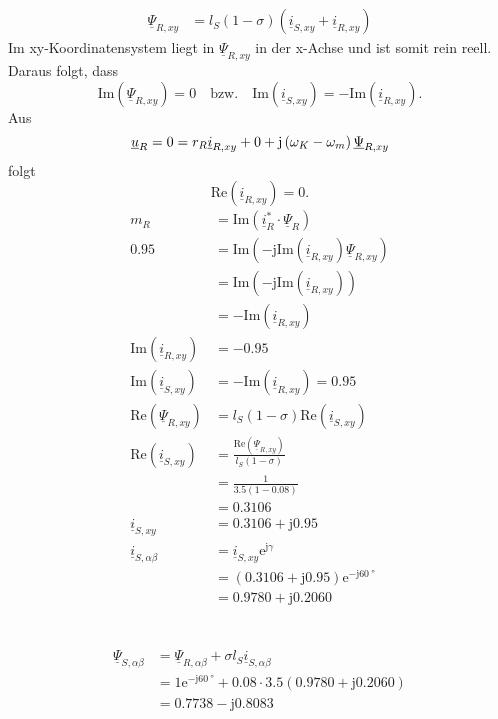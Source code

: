 \documentclass[11pt,a4paper]{scrartcl}
\newcommand{\mybr}[1]{\left(#1\right)}
\renewcommand{\j}{\mathrm{j}}
\renewcommand{\u}{\underline{u}}
\renewcommand{\i}{\underline{i}}
\newcommand{\PPsi}{\underline{\Psi}}
\newcommand{\0}{_{\mybr{0}}}
\newcommand{\1}{_{\mybr{1}}}
\newcommand{\2}{_{\mybr{2}}}
\renewcommand{\e}{\mathrm{e}}
\renewcommand{\Re}{\mathrm{Re}}
\renewcommand{\Im}{\mathrm{Im}}
\begin{document}
\section{}
\begin{align}
	\PPsi_{R,xy}&=l_S\mybr{1-\sigma}\mybr{\i_{S,xy}+\i_{R,xy}}
\end{align}
Im xy-Koordinatensystem liegt in $\PPsi_{R,xy}$ in der x-Achse und ist somit rein reell. Daraus folgt, dass 
\begin{equation}
	\Im\mybr{\PPsi_{R,xy}}=0\quad \text{bzw.}\quad \Im\mybr{\i_{S,xy}}=-\Im\mybr{\i_{R,xy}}.
\end{equation}
Aus
\begin{equation}
	\u_R=0=r_R\i_{R,xy}+0+\j\mybr{\omega_K-\omega_m}\PPsi_{R,xy}\\
\end{equation}
folgt
\begin{equation}
	\Re\mybr{\i_{R,xy}}=0.
\end{equation}
\begin{align}
	m_R&=\Im\mybr{\i_R^*\cdot\PPsi_R}\\
	\num{0.95}&=\Im\mybr{-\j\Im\mybr{\i_{R,xy}}\PPsi_{R,xy}}\\
	&=\Im\mybr{-\j\Im\mybr{\i_{R,xy}}}\\
	&=-\Im\mybr{\i_{R,xy}}\\
	\Im\mybr{\i_{R,xy}}&=\num{-0.95}\\
	\Im\mybr{\i_{S,xy}}&=-\Im\mybr{\i_{R,xy}}=\num{0.95}\\
	\Re\mybr{\PPsi_{R,xy}}&=l_S\mybr{1-\sigma}\Re\mybr{\i_{S,xy}}\\
	\Re\mybr{\i_{S,xy}}&=\frac{\Re\mybr{\PPsi_{R,xy}}}{l_S\mybr{1-\sigma}}\\
	&=\frac{1}{\num{3.5}\mybr{1-\num{0.08}}}\\
	&=\num{0.3106}\\
	\i_{S,xy}&=\num{0.3106}+\j\num{0.95}\\
	\i_{S,\alpha\beta}&=\i_{S,xy}\e^{\j\gamma}\\
	&=\mybr{\num{0.3106}+\j\num{0.95}}\e^{-\j\SI{60}{\degree}}\\
	&=\num{0.9780}+\j\num{0.2060}
\end{align}


\section{}
\begin{align}
	\PPsi_{S,\alpha\beta}&=\PPsi_{R,\alpha\beta}+\sigma l_S\i_{S,\alpha\beta}\\
	&=1\e^{-\j\SI{60}{\degree}}+\num{0.08}\cdot\num{3.5}\mybr{\num{0.9780}+\j\num{0.2060}}\\
	&=\num{0.7738}-\j\num{0.8083}
\end{align}
\end{document}
